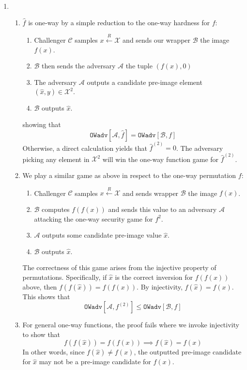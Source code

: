 \documentclass[12pt]{article}%
\newcommand{\chal}{\mathcal{C}}
\newcommand{\A}{\mathcal{A}}
\newcommand{\B}{\mathcal{B}}
\begin{document}
\begin{enumerate}
\begin{enumerate}
      \item
    \end{enumerate}
    \item
    \begin{enumerate}
      \item $\hat{f}$ is one-way by a simple reduction to the one-way hardness for $f$:
      \begin{enumerate}
        \item Challenger $\chal$ samples $x \xleftarrow{R} \mathcal{X}$ and sends our wrapper $\B$ the image $f(x)$.
        \item $\B$ then sends the adversary $\A$ the tuple $(f(x), 0)$
        \item The adversary $\A$ outputs a candidate pre-image element $(\hat{x},y) \in \mathcal{X}^2$.
        \item $\B$ outputs $\hat{x}$.
      \end{enumerate}
      showing that
      $$ \mathtt{OWadv}[\A, \hat{f}] = \mathtt{OWadv}[\B, f] $$
      Otherwise, a direct calculation yields that $\hat{f}^{(2)} = 0$. The adversary picking any element in $\mathcal{X}^2$ will win the one-way function game for $\hat{f}^{(2)}$.
      \item We play a similar game as above in respect to the one-way permutation $f$:
      \begin{enumerate}
        \item Challenger $\chal$ samples $x \xleftarrow{R} \mathcal{X}$ and sends wrapper $\B$ the image $f(x)$.
        \item $\B$ computes $f(f(x))$ and sends this value to an adversary $\A$ attacking the one-way security game for $f^{2}$.
        \item $\A$ outputs some candidate pre-image value $\hat{x}$.
        \item $\B$ outputs $\hat{x}$.
      \end{enumerate}

      The correctness of this game arises from the injective property of permutations. Specifically, if $\hat{x}$ is the correct inversion for $f(f(x))$ above, then $f(f(\hat{x})) = f(f(x))$. By injectivity, $f(\hat{x}) = f(x)$. This shows that
      $$ \mathtt{OWadv}[\A, f^{(2)}] \leq \mathtt{OWadv}[\B, f]$$
      \item
      For general one-way functions, the proof fails where we invoke injectivity to show that
      $$ f(f(\hat{x})) = f(f(x))  \implies f(\hat{x}) = f(x)$$
      In other words, since $f(\hat{x}) \neq f(x)$, the outputted pre-image candidate for $\hat{x}$ may not be a pre-image candidate for $f(x)$.
    \end{enumerate}
\end{enumerate}
\end{document}
